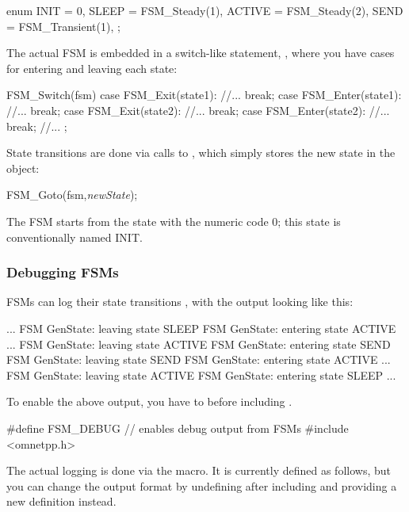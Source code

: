 \begin{cpp}
enum {
  INIT = 0,
  SLEEP = FSM_Steady(1),
  ACTIVE = FSM_Steady(2),
  SEND = FSM_Transient(1),
};
\end{cpp}



The actual FSM is embedded in a switch-like statement,
, where you have cases for entering and leaving
each state:


\begin{cpp}
FSM_Switch(fsm)
{
  case FSM_Exit(state1):
    //...
    break;
  case FSM_Enter(state1):
    //...
    break;
  case FSM_Exit(state2):
    //...
    break;
  case FSM_Enter(state2):
    //...
    break;
  //...
};
\end{cpp}


State transitions are done via calls to
, which simply stores the new state in the
 object:

\begin{cpp}
FSM_Goto(fsm,\textit{newState});
\end{cpp}

The FSM starts from the state with the numeric code 0; this state
is conventionally named INIT.


\subsubsection{Debugging FSMs}

FSMs can log their state transitions ,
with the output looking like this:

\begin{filelisting}
...
FSM GenState: leaving state SLEEP
FSM GenState: entering state ACTIVE
...
FSM GenState: leaving state ACTIVE
FSM GenState: entering state SEND
FSM GenState: leaving state SEND
FSM GenState: entering state ACTIVE
...
FSM GenState: leaving state ACTIVE
FSM GenState: entering state SLEEP
...
\end{filelisting}

To enable the above output, you have to 
before including .

\begin{cpp}
#define FSM_DEBUG    // enables debug output from FSMs
#include <omnetpp.h>
\end{cpp}

The actual logging is done via the  macro.
It is currently defined as follows, but you can change the
output format by undefining  after including
 and providing a new definition instead.

